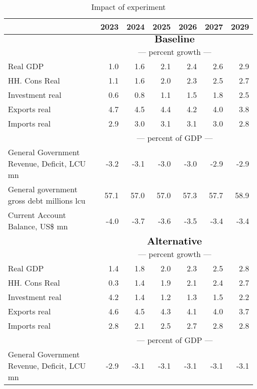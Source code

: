 \documentclass{article}
\begin{document}
\begin{table}[ht]
\caption{Impact of experiment}
\begin{tabular}{lrrrrr|r}
\toprule
 & 2023 & 2024 & 2025 & 2026 & 2027 & 2029 \\
\midrule
&\multicolumn{6}{c}{{$\Large \textbf{Baseline}$}}                                                             \\
&\multicolumn{6}{c}{{---  percent growth ---}}                                                             \\
Real GDP & 1.0 & 1.6 & 2.1 & 2.4 & 2.6 & 2.9 \\
HH. Cons Real & 1.1 & 1.6 & 2.0 & 2.3 & 2.5 & 2.7 \\
Investment real & 0.6 & 0.8 & 1.1 & 1.5 & 1.8 & 2.5 \\
Exports real & 4.7 & 4.5 & 4.4 & 4.2 & 4.0 & 3.8 \\
Imports real & 2.9 & 3.0 & 3.1 & 3.1 & 3.0 & 2.8 \\
&\multicolumn{6}{c}{{---  percent of GDP ---}}                                                             \\
General Government Revenue, Deficit, LCU mn & -3.2 & -3.1 & -3.0 & -3.0 & -2.9 & -2.9 \\
General government gross debt millions lcu & 57.1 & 57.0 & 57.0 & 57.3 & 57.7 & 58.9 \\
Current Account Balance, US\$ mn & -4.0 & -3.7 & -3.6 & -3.5 & -3.4 & -3.4 \\
&\multicolumn{6}{c}{{ }}                                                             \\
&\multicolumn{6}{c}{{$\Large \textbf{Alternative}$}}                                                             \\
&\multicolumn{6}{c}{{---  percent growth ---}}                                                             \\
Real GDP & 1.4 & 1.8 & 2.0 & 2.3 & 2.5 & 2.8 \\
HH. Cons Real & 0.3 & 1.4 & 1.9 & 2.1 & 2.4 & 2.7 \\
Investment real & 4.2 & 1.4 & 1.2 & 1.3 & 1.5 & 2.2 \\
Exports real & 4.6 & 4.5 & 4.3 & 4.1 & 4.0 & 3.7 \\
Imports real & 2.8 & 2.1 & 2.5 & 2.7 & 2.8 & 2.8 \\
&\multicolumn{6}{c}{{---  percent of GDP ---}}                                                             \\
General Government Revenue, Deficit, LCU mn & -2.9 & -3.1 & -3.1 & -3.1 & -3.1 & -3.1 \\

\end{tabular}
\end{table}
\end{document}
